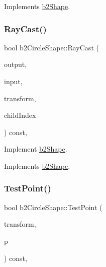 Implements \mbox{\hyperlink{classb2_shape_a05a3c445017d96df9238ceefe6ce37ab}{b2\+Shape}}.

\mbox{\label{classb2_circle_shape_a442e847b9fc3d1344b02b48d490eb0c6}} 
\subsubsection{\texorpdfstring{RayCast()}{RayCast()}}
{\footnotesize\ttfamily bool b2\+Circle\+Shape\+::\+Ray\+Cast (\begin{DoxyParamCaption}\item[{\mbox{\hyperlink{structb2_ray_cast_output}{b2\+Ray\+Cast\+Output}} $\ast$}]{output,  }\item[{const \mbox{\hyperlink{structb2_ray_cast_input}{b2\+Ray\+Cast\+Input}} \&}]{input,  }\item[{const \mbox{\hyperlink{structb2_transform}{b2\+Transform}} \&}]{transform,  }\item[{\mbox{\hyperlink{b2_settings_8h_a43d43196463bde49cb067f5c20ab8481}{int32}}}]{child\+Index }\end{DoxyParamCaption}) const\hspace{0.3cm}{\ttfamily [override]}, {\ttfamily [virtual]}}



Implement \mbox{\hyperlink{classb2_shape}{b2\+Shape}}. 



Implements \mbox{\hyperlink{classb2_shape_aee53a926f4fe64cd03693f6211ef6335}{b2\+Shape}}.

\mbox{\label{classb2_circle_shape_a84e22b3807e84b72f2981010fc197099}} 
\subsubsection{\texorpdfstring{TestPoint()}{TestPoint()}}
{\footnotesize\ttfamily bool b2\+Circle\+Shape\+::\+Test\+Point (\begin{DoxyParamCaption}\item[{const \mbox{\hyperlink{structb2_transform}{b2\+Transform}} \&}]{transform,  }\item[{const \mbox{\hyperlink{structb2_vec2}{b2\+Vec2}} \&}]{p }\end{DoxyParamCaption}) const\hspace{0.3cm}{\ttfamily [override]}, {\ttfamily [virtual]}}



